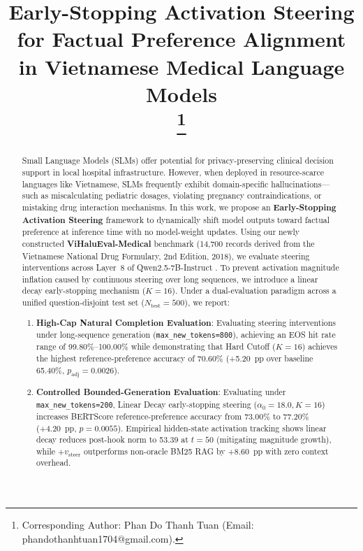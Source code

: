 \documentclass[conference]{IEEEtran}
\begin{document}
\title{Early-Stopping Activation Steering for Factual Preference Alignment in Vietnamese Medical Language Models\\
\thanks{Corresponding Author: Phan Do Thanh Tuan (Email: phandothanhtuan1704@gmail.com).}
}

\author{
}

\maketitle

\begin{abstract}
Small Language Models (SLMs) offer potential for privacy-preserving clinical decision support in local hospital infrastructure. However, when deployed in resource-scarce languages like Vietnamese, SLMs frequently exhibit domain-specific hallucinations---such as miscalculating pediatric dosages, violating pregnancy contraindications, or mistaking drug interaction mechanisms. In this work, we propose an \textbf{Early-Stopping Activation Steering} framework to dynamically shift model outputs toward factual preference at inference time with no model-weight updates. Using our newly constructed \textbf{ViHaluEval-Medical} benchmark (14,700 records derived from the Vietnamese National Drug Formulary, 2nd Edition, 2018), we evaluate steering interventions across Layer~8 of Qwen2.5-7B-Instruct \cite{ref4}. To prevent activation magnitude inflation caused by continuous steering over long sequences, we introduce a linear decay early-stopping mechanism ($K=16$). Under a dual-evaluation paradigm across a unified question-disjoint test set ($N_{\text{test}}=500$), we report:
\begin{enumerate}
    \item \textbf{High-Cap Natural Completion Evaluation}: Evaluating steering interventions under long-sequence generation (\texttt{max\_new\_tokens=800}), achieving an EOS hit rate range of 99.80\%--100.00\% while demonstrating that Hard Cutoff ($K=16$) achieves the highest reference-preference accuracy of 70.60\% (+5.20~pp over baseline 65.40\%, $p_{\text{adj}}=0.0026$).
    \item \textbf{Controlled Bounded-Generation Evaluation}: Evaluating under \texttt{max\_new\_tokens=200}, Linear Decay early-stopping steering ($\alpha_0=18.0, K=16$) increases BERTScore reference-preference accuracy from 73.00\% to 77.20\% (+4.20~pp, $p=0.0055$). Empirical hidden-state activation tracking shows linear decay reduces post-hook norm to 53.39 at $t=50$ (mitigating magnitude growth), while $+v_{\text{steer}}$ outperforms non-oracle BM25 RAG by +8.60~pp with zero context overhead.
\end{enumerate}
\end{abstract}
\end{document}
